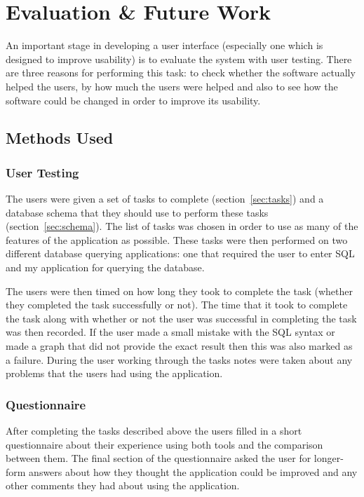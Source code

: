 \chapter{Evaluation \& Future Work}

An important stage in developing a user interface (especially one which is
designed to improve usability) is to evaluate the system with user testing.
There are three reasons for performing this task: to check whether the software
actually helped the users, by how much the users were helped and also to see
how the software could be changed in order to improve its usability.

\section{Methods Used}

\subsection{User Testing}

The users were given a set of tasks to complete (section~\ref{sec:tasks}) and
a database schema that they should use to perform these tasks
(section~\ref{sec:schema}). The list of tasks was chosen in order to use as
many of the features of the application as possible. These tasks were then
performed on two different database querying applications: one that required
the user to enter \ac{SQL} and my application for querying the database.

The users were then timed on how long they took to complete the task (whether
they completed the task successfully or not). The time that it took to complete
the task along with whether or not the user was successful in completing the
task was then recorded. If the user made a small mistake with the \ac{SQL}
syntax or made a graph that did not provide the exact result then this was also
marked as a failure. During the user working through the tasks notes were taken
about any problems that the users had using the application.

\subsection{Questionnaire}

After completing the tasks described above the users filled in a short
questionnaire about their experience using both tools and the comparison
between them. The final section of the questionnaire asked the user for
longer-form answers about how they thought the application could be improved
and any other comments they had about using the application.

